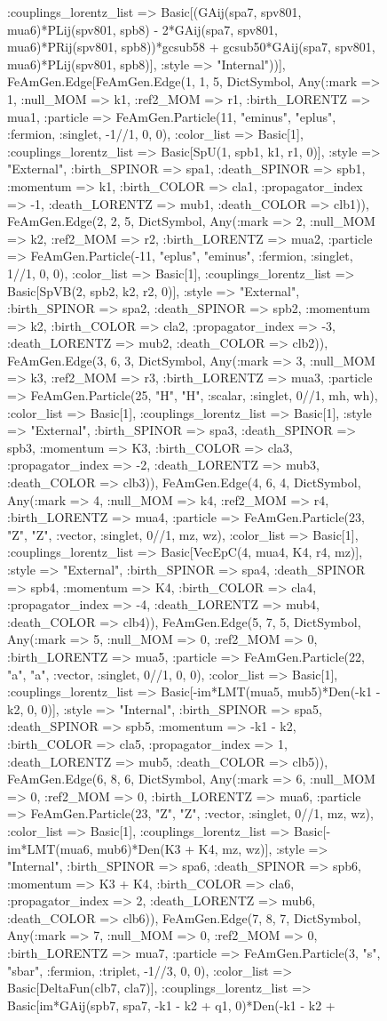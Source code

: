 \documentclass{revtex4}
\begin{document}
\begin{figure}[!htb]
\begin{center}
{:couplings_lorentz_list => Basic[(GAij(spa7, spv801, mua6)*PLij(spv801, spb8) - 2*GAij(spa7, spv801, mua6)*PRij(spv801, spb8))*gcsub58 + gcsub50*GAij(spa7, spv801, mua6)*PLij(spv801, spb8)], :style => "Internal"))], FeAmGen.Edge[FeAmGen.Edge(1, 1, 5, Dict{Symbol, Any}(:mark => 1, :null_MOM => k1, :ref2_MOM => r1, :birth_LORENTZ => mua1, :particle => FeAmGen.Particle(11, "eminus", "eplus", :fermion, :singlet, -1//1, 0, 0), :color_list => Basic[1], :couplings_lorentz_list => Basic[SpU(1, spb1, k1, r1, 0)], :style => "External", :birth_SPINOR => spa1, :death_SPINOR => spb1, :momentum => k1, :birth_COLOR => cla1, :propagator_index => -1, :death_LORENTZ => mub1, :death_COLOR => clb1)), FeAmGen.Edge(2, 2, 5, Dict{Symbol, Any}(:mark => 2, :null_MOM => k2, :ref2_MOM => r2, :birth_LORENTZ => mua2, :particle => FeAmGen.Particle(-11, "eplus", "eminus", :fermion, :singlet, 1//1, 0, 0), :color_list => Basic[1], :couplings_lorentz_list => Basic[SpVB(2, spb2, k2, r2, 0)], :style => "External", :birth_SPINOR => spa2, :death_SPINOR => spb2, :momentum => k2, :birth_COLOR => cla2, :propagator_index => -3, :death_LORENTZ => mub2, :death_COLOR => clb2)), FeAmGen.Edge(3, 6, 3, Dict{Symbol, Any}(:mark => 3, :null_MOM => k3, :ref2_MOM => r3, :birth_LORENTZ => mua3, :particle => FeAmGen.Particle(25, "H", "H", :scalar, :singlet, 0//1, mh, wh), :color_list => Basic[1], :couplings_lorentz_list => Basic[1], :style => "External", :birth_SPINOR => spa3, :death_SPINOR => spb3, :momentum => K3, :birth_COLOR => cla3, :propagator_index => -2, :death_LORENTZ => mub3, :death_COLOR => clb3)), FeAmGen.Edge(4, 6, 4, Dict{Symbol, Any}(:mark => 4, :null_MOM => k4, :ref2_MOM => r4, :birth_LORENTZ => mua4, :particle => FeAmGen.Particle(23, "Z", "Z", :vector, :singlet, 0//1, mz, wz), :color_list => Basic[1], :couplings_lorentz_list => Basic[VecEpC(4, mua4, K4, r4, mz)], :style => "External", :birth_SPINOR => spa4, :death_SPINOR => spb4, :momentum => K4, :birth_COLOR => cla4, :propagator_index => -4, :death_LORENTZ => mub4, :death_COLOR => clb4)), FeAmGen.Edge(5, 7, 5, Dict{Symbol, Any}(:mark => 5, :null_MOM => 0, :ref2_MOM => 0, :birth_LORENTZ => mua5, :particle => FeAmGen.Particle(22, "a", "a", :vector, :singlet, 0//1, 0, 0), :color_list => Basic[1], :couplings_lorentz_list => Basic[-im*LMT(mua5, mub5)*Den(-k1 - k2, 0, 0)], :style => "Internal", :birth_SPINOR => spa5, :death_SPINOR => spb5, :momentum => -k1 - k2, :birth_COLOR => cla5, :propagator_index => 1, :death_LORENTZ => mub5, :death_COLOR => clb5)), FeAmGen.Edge(6, 8, 6, Dict{Symbol, Any}(:mark => 6, :null_MOM => 0, :ref2_MOM => 0, :birth_LORENTZ => mua6, :particle => FeAmGen.Particle(23, "Z", "Z", :vector, :singlet, 0//1, mz, wz), :color_list => Basic[1], :couplings_lorentz_list => Basic[-im*LMT(mua6, mub6)*Den(K3 + K4, mz, wz)], :style => "Internal", :birth_SPINOR => spa6, :death_SPINOR => spb6, :momentum => K3 + K4, :birth_COLOR => cla6, :propagator_index => 2, :death_LORENTZ => mub6, :death_COLOR => clb6)), FeAmGen.Edge(7, 8, 7, Dict{Symbol, Any}(:mark => 7, :null_MOM => 0, :ref2_MOM => 0, :birth_LORENTZ => mua7, :particle => FeAmGen.Particle(3, "s", "sbar", :fermion, :triplet, -1//3, 0, 0), :color_list => Basic[DeltaFun(clb7, cla7)], :couplings_lorentz_list => Basic[im*GAij(spb7, spa7, -k1 - k2 + q1, 0)*Den(-k1 - k2 + }
\end{center}
\end{figure}
\end{document}
